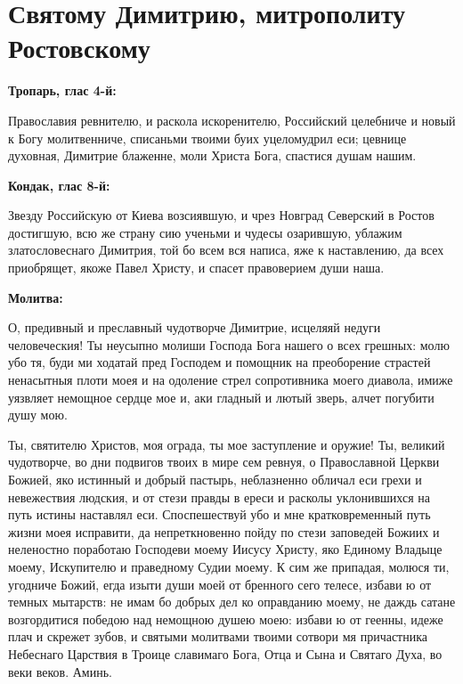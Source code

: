 \medskip\mychapterending


 
\vspace{-\baselineskip}
\section{Святому Димитрию, митрополиту Ростовскому}
 


\bfseries Тропарь, глас 4-й:\normalfont{}\nopagebreak


Православия ревнителю, и раскола искоренителю, Российский целебниче и новый к Богу молитвенниче, списаньми твоими буих уцеломудрил еси; цевнице духовная, Димитрие блаженне, моли Христа Бога, спастися душам нашим.


\medskip


\bfseries Кондак, глас 8-й:\normalfont{}\nopagebreak


Звезду Российскую от Киева возсиявшую, и чрез Новград Северский в Ростов достигшую, всю же страну сию ученьми и чудесы озарившую, ублажим златословеснаго Димитрия, той бо всем вся написа, яже к наставлению, да всех приобрящет, якоже Павел Христу, и спасет правоверием души наша.


\medskip


\bfseries Молитва:\normalfont{}\nopagebreak


О, предивный и преславный чудотворче Димитрие, исцеляяй недуги человеческия! Ты неусыпно молиши Господа Бога нашего о всех грешных: молю убо тя, буди ми ходатай пред Господем и помощник на преоборение страстей ненасытныя плоти моея и на одоление стрел сопротивника моего диавола, имиже уязвляет немощное сердце мое и, аки гладный и лютый зверь, алчет погубити душу мою. 

Ты, святителю Христов, моя ограда, ты мое заступление и оружие! Ты, великий чудотворче, во дни подвигов твоих в мире сем ревнуя, о Православной Церкви Божией, яко истинный и добрый пастырь, неблазненно обличал еси грехи и невежествия людския, и от стези правды в ереси и расколы уклонившихся на путь истины наставлял еси. Споспешествуй убо и мне кратковременный путь жизни моея исправити, да непреткновенно пойду по стези заповедей Божиих и неленостно поработаю Господеви моему Иисусу Христу, яко Единому Владыце моему, Искупителю и праведному Судии моему. К сим же припадая, молюся ти, угодниче Божий, егда изыти души моей от бренного сего телесе, избави ю от темных мытарств: не имам бо добрых дел ко оправданию моему, не даждь сатане возгордитися победою над немощною душею моею: избави ю от геенны, идеже плач и скрежет зубов, и святыми молитвами твоими сотвори мя причастника Небеснаго Царствия в Троице славимаго Бога, Отца и Сына и Святаго Духа, во веки веков. Аминь.


